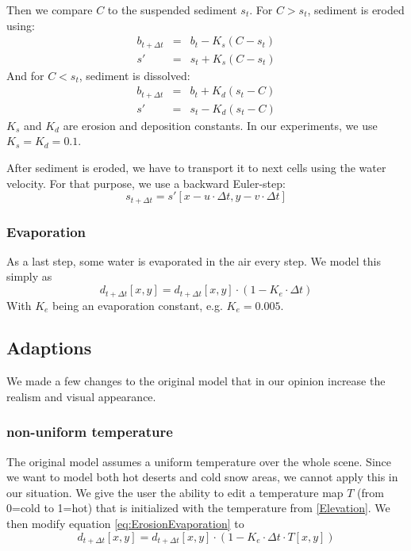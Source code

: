 \documentclass[journal, letterpaper]{IEEEtran}
\begin{document}
Then we compare $C$ to the suspended sediment $s_t$.
For $C>s_t$, sediment is eroded using:
\begin{equation}
\begin{array}{rcl}
	b_{t+\Delta t} &=& b_t - K_s (C-s_t) \\
	s' &=& s_t + K_s (C-s_t)
\end{array}
\label{eq:ErosionSediment3}
\end{equation}
And for $C<s_t$, sediment is dissolved:
\begin{equation}
\begin{array}{rcl}
	b_{t+\Delta t} &=& b_t + K_d (s_t-C) \\
	s' &=& s_t - K_d (s_t-C)
\end{array}
\label{eq:ErosionSediment3}
\end{equation}
$K_s$ and $K_d$ are erosion and deposition constants. In our experiments, we use $K_s=K_d=0.1$.

After sediment is eroded, we have to transport it to next cells using the water velocity. For that purpose, we use a backward Euler-step:
\begin{equation}
	s_{t+\Delta t} = s'[x-u \cdot \Delta t, y - v \cdot \Delta t]
\label{eq:ErosionSediment4}
\end{equation}

\subsubsection{Evaporation}
As a last step, some water is evaporated in the air every step. We model this simply as
\begin{equation}
	d_{t+\Delta t}[x,y] = d_{t+\Delta t}[x,y] \cdot (1-K_e \cdot \Delta t)
\label{eq:ErosionEvaporation}
\end{equation}
With $K_e$ being an evaporation constant, e.g. $K_e=0.005$.

\subsection{Adaptions}
We made a few changes to the original model that in our opinion increase the realism and visual appearance.

\subsubsection{non-uniform temperature}
The original model assumes a uniform temperature over the whole scene. Since we want to model both hot deserts and cold snow areas, we cannot apply this in our situation. 
We give the user the ability to edit a temperature map $T$ (from 0=cold to 1=hot) that is initialized with the temperature from \ref{Elevation}.
We then modify equation \ref{eq:ErosionEvaporation} to 
\begin{equation}
	d_{t+\Delta t}[x,y] = d_{t+\Delta t}[x,y] \cdot (1-K_e \cdot \Delta t \cdot T[x,y])
\label{eq:ErosionEvaporation}
\end{equation}
\end{document}
